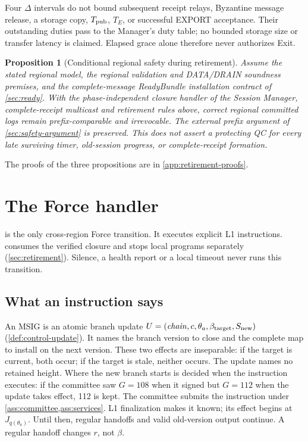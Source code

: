 \documentclass[11pt,a4paper]{article}
\newtheorem{proposition}[proposition]{Proposition}
\begin{document}
Four $\Delta$ intervals do not bound subsequent receipt relays,
Byzantine message release, a storage copy, $T_{\rm pub}$, $T_E$, or
successful EXPORT acceptance. Their outstanding duties pass to the
Manager's duty table; no bounded storage size or transfer latency is
claimed. Elapsed grace alone therefore never authorizes Exit.

\begin{proposition}[Conditional regional safety during retirement]
\label{prop:retirement-safety}
Assume the stated regional model, the regional validation
and DATA/DRAIN soundness premises, and the complete-message ReadyBundle
installation contract of \cref{sec:ready}. With the phase-independent closure handler of the Session Manager,
complete-receipt multicast and retirement rules above, correct regional committed logs
remain prefix-comparable and irrevocable. The external prefix argument
of \cref{sec:safety-argument} is preserved. This does not assert a
protecting QC for every late surviving timer, old-session progress,
or complete-receipt formation.
\end{proposition}


The proofs of the three propositions are in
\cref{app:retirement-proofs}.

\section{The Force handler}
\label{sec:force}
 is the only cross-region Force transition. It executes
explicit L1 instructions.  consumes the verified
closure and stops local programs separately (\cref{sec:retirement}). Silence, a health report
or a local timeout never runs this transition.

\subsection{What an instruction says}
\label{sec:force-stages}
An MSIG is an atomic branch update
$U=(\mathit{chain},c,\theta_a,\beta_{\rm target},S_{\rm new})$
(\cref{def:control-update}). It names the branch version to close and the
complete map to install on the next version. These two effects are
inseparable: if the target is current, both occur; if the target is
stale, neither occurs. The update names no retained height. Where the new
branch starts is decided when the instruction executes: if the committee
saw $G=108$ when it signed but $G=112$ when the update takes effect, 112
is kept. The committee submits the instruction under
\cref{ass:committee,ass:services}. L1 finalization makes it known; its
effect begins at $J_{q(\theta_a)}$. Until then, regular handoffs and
valid old-version output continue. A regular handoff changes $r$, not
$\beta$.
\end{document}
